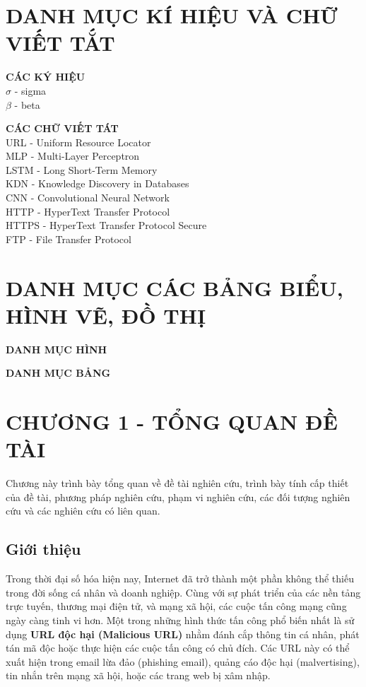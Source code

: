 \documentclass[13pt]{article}
\begin{document}
\newpage
{} %
\tableofcontents
\newpage

\section*{DANH MỤC KÍ HIỆU VÀ CHỮ VIẾT TẮT}

\textbf{CÁC KÝ HIỆU}\\
$\sigma$ - sigma\\
$\beta$ - beta

\textbf{CÁC CHỮ VIẾT TÁT}\\
URL - Uniform Resource Locator\\
MLP - Multi-Layer Perceptron\\
LSTM - Long Short-Term Memory\\
KDN - Knowledge Discovery in Databases\\
CNN - Convolutional Neural Network\\
HTTP - HyperText Transfer Protocol\\
HTTPS - HyperText Transfer Protocol Secure\\
FTP - File Transfer Protocol\\

\newpage

\section*{DANH MỤC CÁC BẢNG BIỂU, HÌNH VẼ, ĐỒ THỊ}
\textbf{DANH MỤC HÌNH}
\renewcommand{\listfigurename}{}
\listoffigures

\newpage
\textbf{DANH MỤC BẢNG}
\renewcommand{\listtablename}{}
\listoftables

\newpage

\setcounter{section}{1} %
\section*{CHƯƠNG 1 - TỔNG QUAN ĐỀ TÀI}
Chương này trình bày tổng quan về đề tài nghiên cứu, trình bày tính cấp thiết của đề tài, phương pháp nghiên cứu, phạm vi nghiên cứu, các đối tượng nghiên cứu và các nghiên cứu có liên quan.
    \subsection{Giới thiệu}
    Trong thời đại số hóa hiện nay, Internet đã trở thành một phần không thể thiếu trong đời sống cá nhân và doanh nghiệp. Cùng với sự phát triển của các nền tảng trực tuyến, thương mại điện tử, và mạng xã hội, các cuộc tấn công mạng cũng ngày càng tinh vi hơn. Một trong những hình thức tấn công phổ biến nhất là sử dụng \textbf{URL độc hại (Malicious URL)} nhằm đánh cắp thông tin cá nhân, phát tán mã độc hoặc thực hiện các cuộc tấn công có chủ đích. Các URL này có thể xuất hiện trong email lừa đảo (phishing email), quảng cáo độc hại (malvertising), tin nhắn trên mạng xã hội, hoặc các trang web bị xâm nhập.
    
\end{document}
